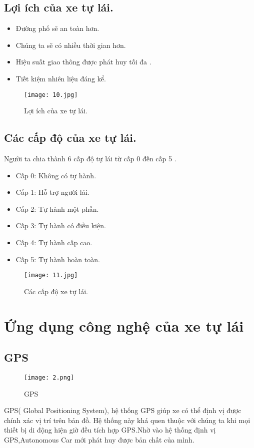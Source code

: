 \documentclass[18pt]{article}
\begin{document}
\subsection{Lợi ích của xe tự lái.}
 \begin{itemize}
     \item Đường phố sẽ an toàn hơn.
     \item Chúng ta sẽ có nhiều thời gian hơn.
     \item Hiệu suất giao thông được phát huy tối đa .
     \item Tiết kiệm nhiên liệu đáng kể.
 \end{itemize}\newpage
 \begin{figure}[h]
     \centering
     \texttt{[image: 10.jpg]}
     \caption{Lợi ích của xe tự lái.}
     \label{fig:my_label}
 \end{figure}
 \subsection{Các cấp độ của xe tự lái.}
 Người ta chia thành 6 cấp độ tự lái từ cấp 0 đến cấp 5 .\\
 \begin{itemize} 
\item  Cấp 0: Không có tự hành. 
\item Cấp 1: Hỗ trợ người lái.
\item  Cấp 2: Tự hành một phần.
\item Cấp 3: Tự hành có điều kiện.
\item Cấp 4: Tự hành cấp cao.
\item  Cấp 5: Tự hành hoàn toàn.
\end{itemize} 
\begin{figure}[h]
     \centering
     \texttt{[image: 11.jpg]}
     \caption{Các cấp độ xe tự lái.}
     \label{fig:my_label}
 \end{figure}\newpage
 \section{Ứng dụng công nghệ của xe tự lái}
\subsection{GPS\cite{link}}
\begin{figure}[h]
\centering 
\texttt{[image: 2.png]} 
\caption{GPS} 
\label{dinhnghia} 
\end{figure}
GPS( Global Positioning System), hệ thống GPS giúp xe có thể định vị được chính xác vị trí trên bản đồ. Hệ thống này khá quen thuộc với chúng ta khi mọi thiết bị di động hiện giờ đều tích hợp GPS.Nhờ vào hệ thống định vị GPS,Autonomous Car mới phát huy được bản chất của mình.
\end{document}
